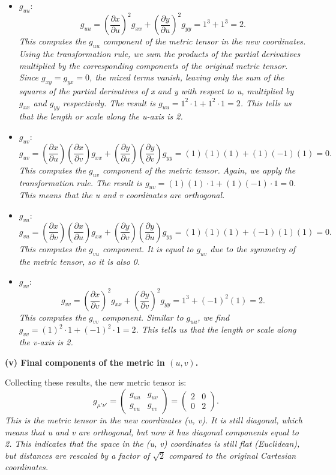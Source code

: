\begin{itemize}
\item \(\displaystyle g_{uu}\):
\[
g_{uu}
=
\left(\frac{\partial x}{\partial u}\right)^2 g_{xx}
+
\left(\frac{\partial y}{\partial u}\right)^2 g_{yy}
=
1^3 + 1^3
=
2.
\]
\emph{This computes the \(g_{uu}\) component of the metric tensor in the new coordinates. Using the transformation rule, we sum the products of the partial derivatives multiplied by the corresponding components of the original metric tensor. Since \(g_{xy} = g_{yx} = 0\), the mixed terms vanish, leaving only the sum of the squares of the partial derivatives of x and y with respect to u, multiplied by \(g_{xx}\) and \(g_{yy}\) respectively. The result is \(g_{uu} = 1^2 \cdot 1 + 1^2 \cdot 1 = 2\). This tells us that the  length  or  scale  along the u-axis is 2.}

\item \(\displaystyle g_{uv}\):
\[
g_{uv}
=
\left(\frac{\partial x}{\partial u}\right)\left(\frac{\partial x}{\partial v}\right) g_{xx}
+
\left(\frac{\partial y}{\partial u}\right)\left(\frac{\partial y}{\partial v}\right) g_{yy}
=
(1)(1)(1) + (1)(-1)(1)
=
0.
\]
\emph{This computes the \(g_{uv}\) component of the metric tensor. Again, we apply the transformation rule. The result is \(g_{uv} = (1)(1) \cdot 1 + (1)(-1) \cdot 1 = 0\). This means that the u and v coordinates are orthogonal.}

\item \(\displaystyle g_{vu}\):
\[
g_{vu}
=
\left(\frac{\partial x}{\partial v}\right)\left(\frac{\partial x}{\partial u}\right) g_{xx}
+
\left(\frac{\partial y}{\partial v}\right)\left(\frac{\partial y}{\partial u}\right) g_{yy}
=
(1)(1)(1) + (-1)(1)(1)
=
0.
\]
\emph{This computes the \(g_{vu}\) component. It is equal to \(g_{uv}\) due to the symmetry of the metric tensor, so it is also 0.}

\item \(\displaystyle g_{vv}\):
\[
g_{vv}
=
\left(\frac{\partial x}{\partial v}\right)^2 g_{xx}
+
\left(\frac{\partial y}{\partial v}\right)^2 g_{yy}
=
1^3 + (-1)^2 (1)
=
2.
\]
\emph{This computes the \(g_{vv}\) component. Similar to \(g_{uu}\), we find \(g_{vv} = (1)^2 \cdot 1 + (-1)^2 \cdot 1 = 2\). This tells us that the  length  or  scale  along the v-axis is 2.}
\end{itemize}

\textbf{(v) Final components of the metric in \((u,v)\).}

Collecting these results, the new metric tensor is:
\[
g_{\mu' \nu'}
=
\begin{pmatrix}
g_{uu} & g_{uv} \\
g_{vu} & g_{vv}
\end{pmatrix}
=
\begin{pmatrix}
2 & 0 \\
0 & 2
\end{pmatrix}.
\]
\emph{This is the metric tensor in the new coordinates (u, v). It is still diagonal, which means that u and v are orthogonal, but now it has diagonal components equal to 2. This indicates that the space in the (u, v) coordinates is still flat (Euclidean), but distances are rescaled by a factor of \(\sqrt{2}\) compared to the original Cartesian coordinates.}

